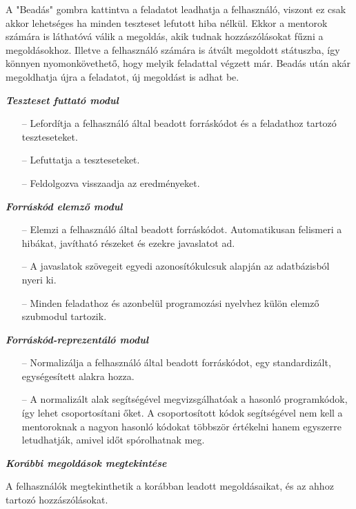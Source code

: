 A "Beadás" gombra kattintva a feladatot leadhatja a felhasználó, viszont ez csak akkor lehetséges ha minden teszteset lefutott hiba nélkül. Ekkor a mentorok számára is láthatóvá válik a megoldás, akik tudnak hozzászólásokat fűzni a megoldásokhoz. Illetve a felhasználó számára is átvált megoldott státuszba, így könnyen nyomonkövethető, hogy melyik feladattal végzett már. Beadás után akár megoldhatja újra a feladatot, új megoldást is adhat be.

\textbf{\textit{Teszteset futtató modul}}

\begin{itemize}
    \item[--] Lefordítja a felhasználó által beadott forráskódot és a feladathoz tartozó teszteseteket.
    \item[--] Lefuttatja a teszteseteket.
    \item[--] Feldolgozva visszaadja az eredményeket.
\end{itemize}

\textbf{\textit{Forráskód elemző modul}}

\begin{itemize}
    \item[--] Elemzi a felhasználó által beadott forráskódot. Automatikusan felismeri a hibákat, javítható részeket és ezekre javaslatot ad.
    \item[--] A javaslatok szövegeit egyedi azonosítókulcsuk alapján az adatbázisból nyeri ki.
    \item[--] Minden feladathoz és azonbelül programozási nyelvhez külön elemző szubmodul tartozik.
\end{itemize}

\textbf{\textit{Forráskód-reprezentáló modul}}

\begin{itemize}
    \item[--] Normalizálja a felhasználó által beadott forráskódot, egy standardizált, egységesített alakra hozza.
    \item[--] A normalizált alak segítségével megvizsgálhatóak a hasonló programkódok, így lehet csoportosítani őket. A csoportosított kódok segítségével nem kell a mentoroknak a nagyon hasonló kódokat többször értékelni hanem egyszerre letudhatják, amivel időt spórolhatnak meg.
\end{itemize}

\textbf{\textit{Korábbi megoldások megtekintése}}

A felhasználók megtekinthetik a korábban leadott megoldásaikat, és az ahhoz tartozó hozzászólásokat.

